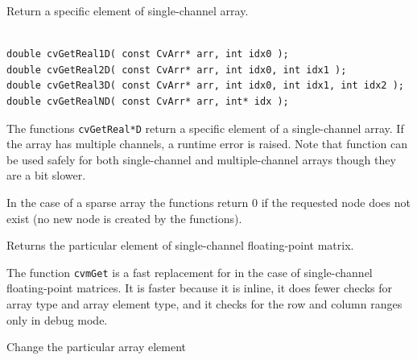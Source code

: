 Return a specific element of single-channel array.

\begin{lstlisting}

double cvGetReal1D( const CvArr* arr, int idx0 );
double cvGetReal2D( const CvArr* arr, int idx0, int idx1 );
double cvGetReal3D( const CvArr* arr, int idx0, int idx1, int idx2 );
double cvGetRealND( const CvArr* arr, int* idx );

\end{lstlisting}
\fi

\begin{description}
\end{description}


The functions \texttt{cvGetReal*D} return a specific element of a single-channel array. If the array has multiple channels, a runtime error is raised. Note that  function can be used safely for both single-channel and multiple-channel arrays though they are a bit slower.

In the case of a sparse array the functions return 0 if the requested node does not exist (no new node is created by the functions).

\label{mGet}

Returns the particular element of single-channel floating-point matrix.


\begin{description}
\end{description}

The function \texttt{cvmGet} is a fast replacement for 
in the case of single-channel floating-point matrices. It is faster because
it is inline, it does fewer checks for array type and array element type,
and it checks for the row and column ranges only in debug mode.

\ifplastex
{} 
 
 
Change the particular array element

